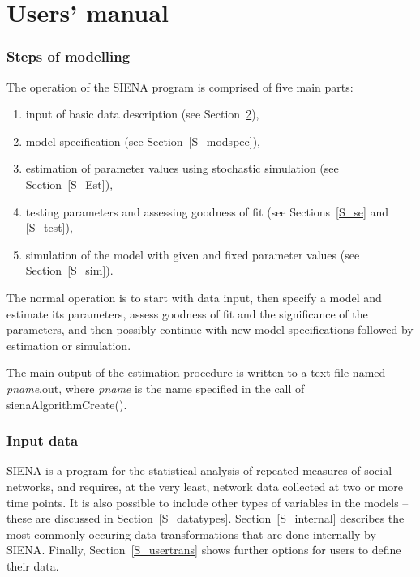 \documentclass[a4paper,fleqn,11pt]{article}
\newcommand{\+}{\, + \,}
\newcommand{\SI}{{\sf SIENA }}
\newcommand{\si}{{\sf SIENA}}
\begin{document}
\newpage
\part{Users' manual}

\section{Steps of modelling}
\label{S_parts}

The operation of the \SI program is comprised of five main parts:
\begin{enumerate}
 \item input of basic data description (see Section~\ref{S_InputData}),
 \item model specification (see Section~\ref{S_modspec}),
 \item estimation of parameter values using stochastic simulation
        (see Section~\ref{S_Est}),
 \item testing parameters and assessing goodness of fit
        (see Sections~\ref{S_se} and \ref{S_test}),
 \item simulation of the model with given and fixed parameter values
        (see Section~\ref{S_sim}).
\end{enumerate}

The normal operation is to start with data input, then specify a
model and estimate its parameters,
assess goodness of fit and the significance of the parameters,
and then possibly continue with new
model specifications followed by estimation or simulation.

The main output of the estimation procedure
is written to a text file named
\textsf{\textsl{pname}.out}, where \textsf{\textsl{pname}} is the name
specified in the call of \textsf{sienaAlgorithmCreate()}.

\newpage

\section{Input data}
\label{S_InputData}

\SI is a program for the statistical analysis
of repeated measures of social networks, and requires, at the very
least, network data collected at two or more time points. It is also possible
to include other types of variables in the models -- these are discussed in
Section~\ref{S_datatypes}. Section~\ref{S_internal} describes the most
commonly occuring
data transformations that are done internally by \si.
Finally, Section~\ref{S_usertrans}
shows further options for users to define their data.
\end{document}
